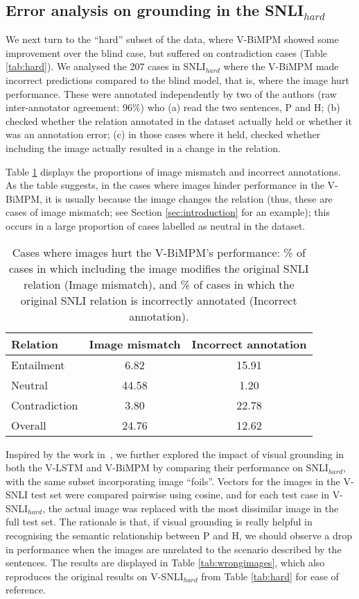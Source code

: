 \documentclass[11pt]{article}
\begin{document}
\subsection{Error analysis on grounding in the SNLI$_{hard}$}
We next turn to the ``hard'' subset of the data, where V-BiMPM showed some improvement 
over the blind case, but suffered on contradiction cases (Table \ref{tab:hard}). 
We analysed the 207 cases in SNLI$_{hard}$ where the
V-BiMPM made incorrect predictions compared to the blind model, that
is, where the image hurt performance. These were annotated
independently by two of the authors (raw inter-annotator agreement:
96\%) who (a) read the two sentences, P and H; (b) checked whether the
relation annotated in the dataset actually held or whether it was an
annotation error; (c) in those cases where it held, 
checked whether including the image actually resulted in a change in
the relation. 

Table \ref{tab:hard-mismatch} displays the proportions
of image mismatch and incorrect annotations. As the table suggests, in the cases where images hinder performance in
the V-BiMPM, it is usually because the image changes the relation
(thus, these are cases of image mismatch; see Section \ref{sec:introduction} for an example); this occurs in a large proportion of cases labelled
as neutral in the dataset.

\begin{table}
\small
\begin{center}
\begin{tabular}{|l|c|c|}
\hline
Relation & Image mismatch & Incorrect annotation \\
\hline
Entailment & 6.82 & 15.91 \\
Neutral & 44.58 & 1.20 \\
Contradiction & 3.80 & 22.78 \\
\hline
Overall & 24.76 & 12.62 \\
\hline
\end{tabular}
\caption{Cases where images hurt the V-BiMPM's performance: \% of
  cases in which including the image modifies the original SNLI relation (Image mismatch), and
 \% of cases in which the original SNLI relation is incorrectly annotated (Incorrect annotation).}\label{tab:hard-mismatch}
\end{center}
\end{table}


Inspired by the work in~\cite{miro:exam17}, we further explored the impact of visual grounding in both the V-LSTM
and V-BiMPM by comparing their performance on SNLI$_{hard}$, with the
same subset incorporating image ``foils''. Vectors for the images in the
V-SNLI test set were compared pairwise using cosine, and for each test
case in V-SNLI$_{hard}$, the actual image was replaced with the most
dissimilar image in the full test set.  The rationale is that, if
visual grounding is really helpful in recognising the semantic
relationship between P and H, we should observe a drop in performance
when the images are unrelated to the scenario described by the
sentences. The results are displayed in Table \ref{tab:wrongimages}, which also reproduces the original results on V-SNLI$_{hard}$ from Table \ref{tab:hard} for ease of reference.
\end{document}
